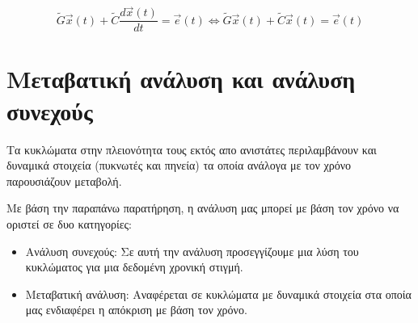 


\begin{equation} \label{GxtCdxt}
\widetilde{G} \overrightarrow{x}(t) + \widetilde{C}\frac{d \overrightarrow{x}(t)}{dt} = \overrightarrow{e}(t) \Leftrightarrow \widetilde{G} \overrightarrow{x}(t) + \widetilde{C}\overrightarrow{x}(t) = \overrightarrow{e}(t)
\end{equation}

\section{Μεταβατική ανάλυση και ανάλυση συνεχούς}
Τα κυκλώματα στην πλειονότητα τους εκτός απο ανιστάτες περιλαμβάνουν και δυναμικά στοιχεία (πυκνωτές και πηνεία) τα οποία ανάλογα με τον χρόνο παρουσιάζουν μεταβολή.

Με βάση την παραπάνω παρατήρηση, η ανάλυση μας μπορεί με βάση τον χρόνο να οριστεί σε δυο κατηγορίες:
\begin{itemize}
    \item Ανάλυση συνεχούς: Σε αυτή την ανάλυση προσεγγίζουμε μια λύση του κυκλώματος για μια δεδομένη χρονική στιγμή.
    \item Μεταβατική ανάλυση: Αναφέρεται σε κυκλώματα με δυναμικά στοιχεία στα οποία μας ενδιαφέρει η απόκριση με βάση τον χρόνο.
\end{itemize}

